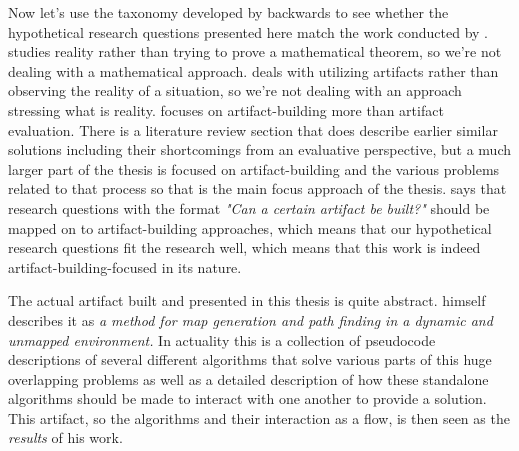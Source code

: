 \documentclass{article}
\begin{document}
%
%

	\par Now let's use the taxonomy developed by \textcite{P2} backwards 
to see whether the hypothetical research questions presented here match the 
work conducted by \textcite{T2}. \textcite{T2} studies reality rather than 
trying to prove a mathematical theorem, so we're not dealing with a 
mathematical approach. \textcite{T2} deals with utilizing artifacts rather than 
observing the reality of a situation, so we're not dealing with an approach 
stressing what is reality. \textcite{T2} focuses on artifact-building more 
than artifact evaluation. There is a literature review section that does 
describe earlier similar solutions including their shortcomings from an 
evaluative perspective,\parencite{T2} but a much larger part of the thesis is 
focused on artifact-building and the various problems related to that process 
so that is the main focus approach of the thesis. \textcite{P2} says that 
research questions with the format \textit{"Can a certain artifact be built?"} 
should be mapped on to artifact-building approaches, which means that our 
hypothetical research questions fit the research well, which means that this 
work is indeed artifact-building-focused in its nature.


	\par The actual artifact built and presented in this thesis is quite 
abstract. \textcite{T2} himself describes it as 
\textit{a method for map generation and path finding in a dynamic and unmapped environment.}
In actuality this is a collection of pseudocode descriptions of several 
different algorithms that solve various parts of this huge overlapping 
problems as well as a detailed description of how these standalone algorithms 
should be made to interact with one another to provide a solution. This 
artifact, so the algorithms and their interaction as a flow, is then seen as 
the \textit{results} of his work.\parencite{T2}
\end{document}
